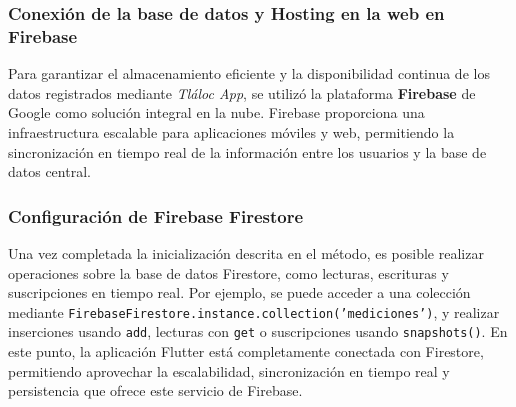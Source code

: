 \begin{table}[h!]
    \centering
    \caption{Funciones Clave de Firebase en el Código}
    \label{tabt2}
    \end{table}






\subsubsection{Conexión de la base de datos y Hosting en la web en Firebase}

 

Para garantizar el almacenamiento eficiente y la disponibilidad continua de los datos registrados mediante \textit{Tláloc App}, se utilizó la plataforma \textbf{Firebase} de Google como solución integral en la nube. Firebase proporciona una infraestructura escalable para aplicaciones móviles y web, permitiendo la sincronización en tiempo real de la información entre los usuarios y la base de datos central.

\subsubsection*{Configuración de Firebase Firestore}

Una vez completada la inicialización descrita en el método, es posible realizar operaciones sobre la base de datos Firestore, como lecturas, escrituras y suscripciones en tiempo real. Por ejemplo, se puede acceder a una colección mediante \texttt{FirebaseFirestore.instance.collection('mediciones')}, y realizar inserciones usando \texttt{add}, lecturas con \texttt{get} o suscripciones usando \texttt{snapshots()}. En este punto, la aplicación Flutter está completamente conectada con Firestore, permitiendo aprovechar la escalabilidad, sincronización en tiempo real y persistencia que ofrece este servicio de Firebase.



